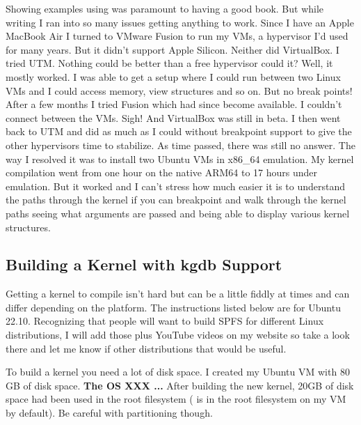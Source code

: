 Showing examples using  was paramount to having a good book. But while writing I ran into so many issues getting anything to work. Since I have an Apple MacBook Air I turned to VMware Fusion to run my VMs, a hypervisor I'd used for many years. But it didn't support Apple Silicon. Neither did VirtualBox. I tried UTM. Nothing could be better than a free hypervisor could it? Well, it mostly worked. I was able to get a setup where I could run  between two Linux VMs and I could access memory, view structures and so on. But no break points! After a few months I tried Fusion which had since become available. I couldn't connect between the VMs. Sigh! And VirtualBox was still in beta. I then went back to UTM and did as much as I could without breakpoint support to give the other hypervisors time to stabilize. As time passed, there was still no answer. The way I resolved it was to install two Ubuntu VMs in x86\_64 emulation. My kernel compilation went from one hour on the native ARM64 to 17 hours under emulation. But it worked and I can't stress how much easier it is to understand the paths through the kernel if you can breakpoint and walk through the kernel paths seeing what arguments are passed and being able to display various kernel structures.


\subsection{Building a Kernel with kgdb Support}


Getting a kernel to compile isn't hard but can be a little fiddly at times and can differ depending on the platform. The instructions listed below are for Ubuntu 22.10. Recognizing that people will want to build SPFS for different Linux distributions, I will add those plus YouTube videos on my website so take a look there and let me know if other distributions that would be useful.

To build a kernel you need a lot of disk space. I created my Ubuntu VM with 80 GB of disk space. \textbf{The OS XXX ...}
After building the new kernel, 20GB of disk space had been used in the root filesystem ( is in the root filesystem on my VM by default). Be careful with partitioning though.

